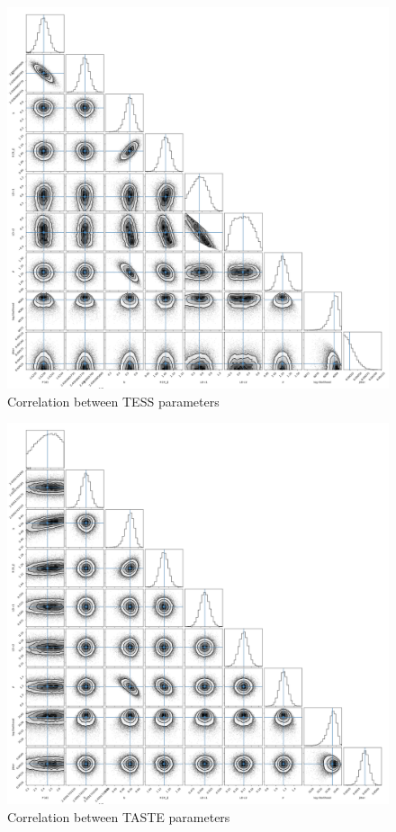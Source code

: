 \documentclass[a4paper,11pt,twocolumn]{article}
\begin{document}
\begin{figure}[H]
    \centering
      \includegraphics[scale=0.2, angle=0]{../pictures/tess/corner_tess.png}
       \caption{Correlation between TESS parameters}
\end{figure}

\begin{figure}[H]
    \centering
      \includegraphics[scale=0.2, angle=0]{../pictures/taste/corner_taste.png}
      \caption{Correlation between TASTE parameters}
\end{figure}
\end{document}
